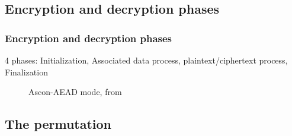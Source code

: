 \documentclass{beamer}
\begin{document}
	\subsection{Encryption and decryption phases}
	\begin{frame}
		\frametitle{Encryption and decryption phases}
		
		4 phases: Initialization, Associated data process, plaintext/ciphertext process, Finalization
		
		\begin{figure}
			\centering
			\resizebox{350pt}{80pt}{
				
			}
			\caption{Ascon-AEAD mode, from \cite{cours_crypto}}
		\end{figure}	
	\end{frame}
	
	\subsection{The permutation}
\end{document}
